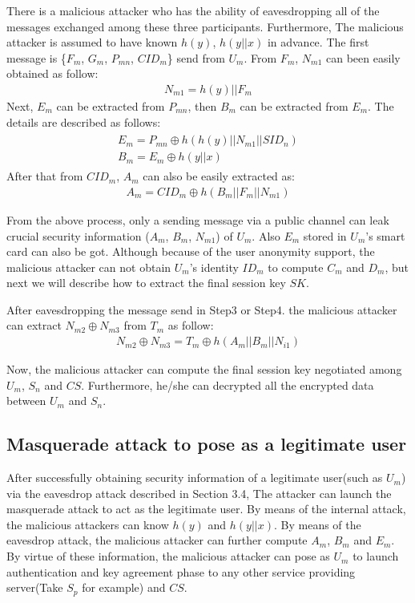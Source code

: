\documentclass[preprint,12pt]{elsarticle}
\begin{document}
There is a malicious attacker who has the ability of eavesdropping all of the messages exchanged among these three participants. Furthermore, The malicious attacker is assumed to have known $h(y)$, $h(y||x)$ in advance. The first message is  \{$F_m$, $G_m$, $P_{mn}$, $CID_m$\} send from $U_m$. From $F_m$, $N_{m1}$ can been easily obtained as follow:
\begin{eqnarray}
N_{m1}=h(y)||F_m
\end{eqnarray}
Next, $E_m$ can be extracted from $P_{mn}$, then $B_m$ can be extracted from $E_m$. The details are described as follows:
\begin{eqnarray}
\left.\begin{array}{l}
E_m=P_{mn}\oplus h(h(y)||N_{m1}||SID_n)\\
B_m=E_m\oplus h(y||x)
 \end{array} \right.
\end{eqnarray}
After that from $CID_m$, $A_m$ can also be easily extracted as:
\begin{eqnarray}
A_m=CID_m\oplus h(B_m||F_m||N_{m1})
\end{eqnarray}

From the above process, only a sending message via a public channel can leak crucial security information ($A_m$, $B_m$, $N_{m1}$) of $U_m$. Also $E_m$ stored in $U_m$'s smart card can also be got. Although because of the user anonymity support, the malicious attacker can not obtain $U_m$'s identity $ID_m$ to compute $C_m$ and $D_m$, but next we will describe how to extract the final session key $SK$.

After eavesdropping the message send in Step3 or Step4. the malicious attacker can extract $N_{m2}\oplus N_{m3}$ from $T_m$ as follow:
\begin{eqnarray}
N_{m2}\oplus N_{m3}=T_m\oplus h(A_m||B_m||N_{i1})
\end{eqnarray}

Now, the malicious attacker can compute the final session key negotiated among $U_m$, $S_n$ and $CS$. Furthermore, he/she can decrypted all the encrypted data between $U_m$ and $S_n$.

\subsection{Masquerade attack to pose as a legitimate user}
After successfully obtaining security information of a legitimate user(such as $U_m$) via the eavesdrop attack described in Section 3.4, The attacker can launch the masquerade attack to act as the legitimate user. By means of the internal attack, the malicious attackers can know $h(y)$ and $h(y||x)$. By means of the eavesdrop attack, the malicious attacker can further compute $A_m$, $B_m$ and $E_m$. By virtue of these information, the malicious attacker can pose as $U_m$ to launch authentication and key agreement phase to any other service providing server(Take $S_p$ for example) and $CS$.
\end{document}
